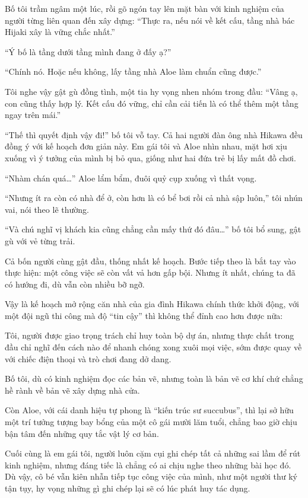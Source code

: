\documentclass[../main.tex]{subfiles}
\begin{document}
Bố tôi trầm ngâm một lúc, rồi gõ ngón tay lên mặt bàn với kinh nghiệm của người từng liên quan đến xây dựng: ``Thực ra, nếu nói về kết cấu, tầng nhà bác Hijaki xây là vững chắc nhất.''

``Ý bố là tầng dưới tầng mình đang ở đấy ạ?''

``Chính nó. Hoặc nếu không, lấy tầng nhà Aloe làm chuẩn cũng được.''

Tôi nghe vậy gật gù đồng tình, một tia hy vọng nhen nhóm trong đầu: ``Vâng ạ, con cũng thấy hợp lý. Kết cấu đó vững, chỉ cần cải tiến là có thể thêm một tầng ngay trên mái.''

``Thế thì quyết định vậy đi!'' bố tôi vỗ tay. Cả hai người đàn ông nhà Hikawa đều đồng ý với kế hoạch đơn giản này. Em gái tôi và Aloe nhìn nhau, mặt hơi xịu xuống vì ý tưởng của mình bị bỏ qua, giống như hai đứa trẻ bị lấy mất đồ chơi.

``Nhàm chán quá\dots'' Aloe lẩm bẩm, đuôi quỷ cụp xuống vì thất vọng.

``Nhưng ít ra còn có nhà để ở, còn hơn là có bể bơi rồi cả nhà sập luôn,'' tôi nhún vai, nói theo lẽ thường.

``Và chú nghĩ vị khách kia cũng chẳng cần mấy thứ đó đâu\dots'' bố tôi bổ sung, gật gù với vẻ từng trải.

Cả bốn người cùng gật đầu, thống nhất kế hoạch. Bước tiếp theo là bắt tay vào thực hiện: một công việc sẽ còn vất vả hơn gấp bội. Nhưng ít nhất, chúng ta đã có hướng đi, dù vẫn còn nhiều bỡ ngỡ.

\ct

Vậy là kế hoạch mở rộng căn nhà của gia đình Hikawa chính thức khởi động, với một đội ngũ thi công mà độ ``tin cậy'' thì không thể đỉnh cao hơn được nữa:

Tôi, người được giao trọng trách chỉ huy toàn bộ dự án, nhưng thực chất trong đầu chỉ nghĩ đến cách nào để nhanh chóng xong xuôi mọi việc, sớm được quay về với chiếc điện thoại và trò chơi đang dở dang. 

Bố tôi, dù có kinh nghiệm đọc các bản vẽ, nhưng toàn là bản vẽ cơ khí chứ chẳng hề rành về bản vẽ xây dựng nhà cửa. 

Còn Aloe, với cái danh hiệu tự phong là ``kiến trúc sư succubus'', thì lại sở hữu một trí tưởng tượng bay bổng của một cô gái mười lăm tuổi, chẳng bao giờ chịu bận tâm đến những quy tắc vật lý cơ bản. 

Cuối cùng là em gái tôi, người luôn cặm cụi ghi chép tất cả những sai lầm để rút kinh nghiệm, nhưng đáng tiếc là chẳng có ai chịu nghe theo những bài học đó. Dù vậy, cô bé vẫn kiên nhẫn tiếp tục công việc của mình, như một người thư ký tận tụy, hy vọng những gì ghi chép lại sẽ có lúc phát huy tác dụng.
\end{document}
